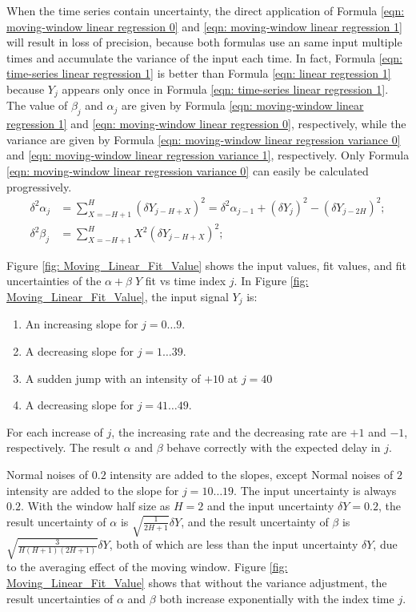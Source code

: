 \documentclass[twoside]{article}
\numberwithin{equation}{section}
\begin{document}
When the time series contain uncertainty, the direct application of Formula \eqref{eqn: moving-window linear regression 0} and \eqref{eqn: moving-window linear regression 1} will result in loss of precision, because both formulas use an same input multiple times and accumulate the variance of the input each time.
In fact, Formula \eqref{eqn: time-series linear regression 1} is better than Formula \eqref{eqn: linear regression 1} because $Y_j$ appears only once in  Formula \eqref{eqn: time-series linear regression 1}.
The value of $\beta_j$ and $\alpha_j$ are given by Formula \eqref{eqn: moving-window linear regression 1} and \eqref{eqn: moving-window linear regression 0}, respectively, while the variance are given by Formula \eqref{eqn: moving-window linear regression variance 0} and \eqref{eqn: moving-window linear regression variance 1}, respectively.
Only Formula \eqref{eqn: moving-window linear regression variance 0} can easily be calculated progressively.
\begin{align}
\label{eqn: moving-window linear regression variance 0}
\delta^2 \alpha_{j} &= \sum_{X=-H+1}^{H} (\delta Y_{j-H+X})^2 = \delta^2 \alpha_{j-1} + (\delta Y_{j})^2 - (\delta Y_{j-2H})^2; \\
\label{eqn: moving-window linear regression variance 1}
\delta^2 \beta_{j} &= \sum_{X=-H+1}^{H} X^2 (\delta Y_{j-H+X})^2;
\end{align}

Figure \ref{fig: Moving_Linear_Fit_Value} shows the input values, fit values, and fit uncertainties of the $\alpha + \beta\; Y$ fit vs time index $j$.
In Figure \ref{fig: Moving_Linear_Fit_Value}, the input signal $Y_j$ is:
\begin{enumerate}
\item An increasing slope for $j = 0 \dots 9$.

\item A decreasing slope for $j = 1 \dots 39$.

\item A sudden jump with an intensity of $+10$ at $j=40$

\item A decreasing slope for $j = 41 \dots 49$.
\end{enumerate}
For each increase of $j$, the increasing rate and the decreasing rate are $+1$ and $-1$, respectively.
The result $\alpha$ and $\beta$ behave correctly with the expected delay in $j$.

Normal noises of $0.2$ intensity are added to the slopes, except Normal noises of $2$ intensity are added to the slope for $j = 10 \dots 19$.
The input uncertainty is always $0.2$.
With the window half size as $H=2$ and the input uncertainty $\delta Y=0.2$, the result uncertainty of $\alpha$ is $\sqrt{\frac{1}{2H+1}} \delta Y$, and the  result uncertainty of $\beta$ is $\sqrt{\frac{3}{H (H+1)(2H+1)}} \delta Y$, both of which are less than the input uncertainty $\delta Y$, due to the averaging effect of the moving window.
Figure \ref{fig: Moving_Linear_Fit_Value} shows that without the variance adjustment, the result uncertainties of $\alpha$ and $\beta$ both increase exponentially with the index time $j$.
\end{document}
